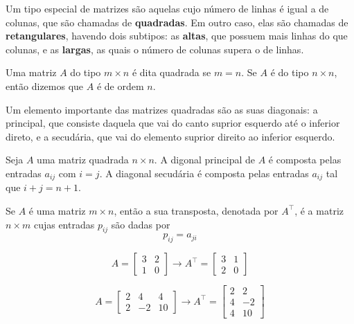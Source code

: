 Um tipo especial de matrizes são aquelas cujo número de linhas é igual a de colunas,
que são chamadas de \textbf{quadradas}.
Em outro caso, elas são chamadas de \textbf{retangulares}, havendo dois subtipos:
as \textbf{altas}, que possuem mais linhas do que colunas, e as \textbf{largas}, as quais
o número de colunas supera o de linhas.

\begin{def:matriz quadrada}
Uma matriz $A$ do tipo $m \times n$ é dita quadrada se $m = n$.
Se $A$ é do tipo $n \times n$, então dizemos que $A$ é de ordem $n$.
\end{def:matriz quadrada}

Um elemento importante das matrizes quadradas são as suas diagonais: a principal, que
consiste daquela que vai do canto suprior esquerdo até o inferior direto, e a secudária,
que vai do elemento suprior direito ao inferior esquerdo.

\begin{def:diagonal}
Seja $A$ uma matriz quadrada $n \times n$.
A digonal principal de $A$ é composta pelas entradas $a_{ij}$ com $i = j$.
A diagonal secudária é composta pelas entradas $a_{ij}$ tal que $i + j = n + 1$.
\end{def:diagonal}

\begin{def:transposta}
Se $A$ é uma matriz $m \times n$, então a sua transposta, denotada por $A^\top$, é
a matriz $n \times m$ cujas entradas $p_{ij}$ são dadas por
\[
	p_{ij} = a_{ji}
\]
\end{def:transposta}

\begin{exp:transposta1}
\[
	A = \begin{bmatrix}
		3 & 2 \\
		1 & 0
	\end{bmatrix} \rightarrow
	A^\top = \begin{bmatrix}
		3 & 1 \\
		2 & 0
	\end{bmatrix}
\]
\end{exp:transposta1}

\begin{exp:transposta2}
\[
	A = \begin{bmatrix}
		2 & 4  & 4  \\
		2 & -2 & 10
	\end{bmatrix} \rightarrow
	A^\top = \begin{bmatrix}
		2 & 2  \\
		4 & -2 \\
		4 & 10
	\end{bmatrix}
\]
\end{exp:transposta2}

